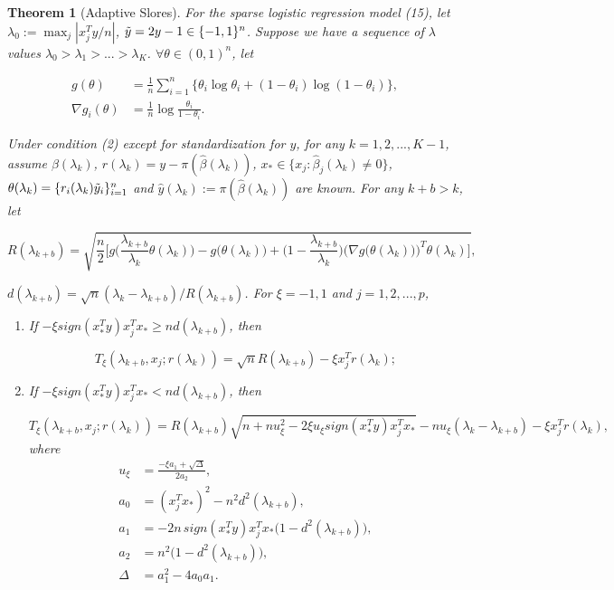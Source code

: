 \documentclass{article}
\newtheorem{theorem}{Theorem}[section]
\begin{document}
\begin{theorem}[Adaptive Slores]
For the sparse logistic regression model (15), let $\lambda_0:=\max_j|x_j^Ty/n|$, $\Tilde{y}=2y-1\in\{-1,1\}^n$. Suppose we have a sequence of $\lambda$ values $\lambda_0>\lambda_1>...>\lambda_K$. $\forall\theta\in(0,1)^n$, let 

\begin{equation}
    \begin{split}
        g(\theta)&=\frac{1}{n}\sum_{i=1}^n\{\theta_i\log \theta_i+(1-\theta_i)\log(1-\theta_i)\},\\
    \nabla g_i(\theta) &= \frac{1}{n}\log\frac{\theta_i}{1-\theta_i}.
    \end{split}
\end{equation}

Under condition (2) except for standardization for $y$, for any $k=1,2,...,K-1$, assume $\hat{\beta}(\lambda_k)$, $r(\lambda_k)=y-\pi(\hat{\beta}(\lambda_k))$, $x_*\in\{x_j:\hat{\beta}_j(\lambda_k)\neq0\} $, $\theta(\lambda_k)=\{r_i(\lambda_k)\Tilde{y}_i\}_{i=1}^n$ and $\hat{y}(\lambda_k):=\pi(\hat{\beta}(\lambda_k))$ are known. For any $k+b>k$, let

\begin{equation}
    R(\lambda_{k+b})=\sqrt{\frac{n}{2}\bigg[g\bigg(\frac{\lambda_{k+b}}{\lambda_k}\theta(\lambda_k)\bigg)-g\bigg(\theta(\lambda_k)\bigg)+\bigg(1-\frac{\lambda_{k+b}}{\lambda_k}\bigg)\bigg(\nabla g\big(\theta(\lambda_k)\big)\bigg)^T\theta(\lambda_k)\bigg]},
\end{equation}

$d(\lambda_{k+b})=\sqrt{n}(\lambda_k-\lambda_{k+b})/R(\lambda_{k+b})$. For $\xi = -1,1$ and $j=1,2,...,p$,

\begin{enumerate}
    \item If $-\xi sign(x_*^Ty)x_j^Tx_*\geq nd(\lambda_{k+b})$, then
    
    \begin{equation}
        T_\xi(\lambda_{k+b},x_j;r(\lambda_k))=\sqrt{n}R(\lambda_{k+b})-\xi x_j^Tr(\lambda_k);
    \end{equation}
    
    \item If $-\xi sign(x_*^Ty)x_j^Tx_*< nd(\lambda_{k+b})$, then
    
    \begin{equation}
        T_\xi(\lambda_{k+b},x_j;r(\lambda_k))=R(\lambda_{k+b})\sqrt{n+nu_\xi^2-2\xi u_\xi sign(x_*^Ty)x_j^Tx_*}-nu_\xi(\lambda_k-\lambda_{k+b})-\xi x_j^Tr(\lambda_k),
    \end{equation}
    where
    \begin{align}
        u_\xi&=\frac{-\xi a_1+\sqrt{\Delta}}{2a_2},\\
        a_0&=(x_j^Tx_*)^2-n^2d^2(\lambda_{k+b}),\nonumber\\
        a_1&=-2n\,sign(x_*^Ty)x_j^Tx_*\big(1-d^2(\lambda_{k+b})\big),\nonumber\\
        a_2&=n^2\big(1-d^2(\lambda_{k+b})\big),\nonumber\\
        \Delta&=a_1^2-4a_0a_1.\nonumber
    \end{align}
\end{enumerate}


\end{theorem}
\end{document}

